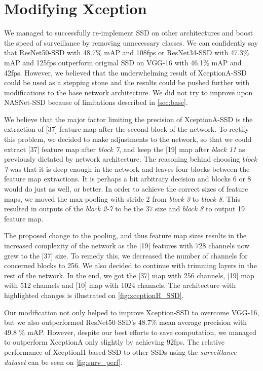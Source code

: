 \section{Modifying Xception}
\label{sec:fixxception}
We managed to successfully re-implement SSD on other architectures and boost the speed of surveillance by removing unnecessary classes. We can confidently say that ResNet50-SSD with 48.7\% mAP and 108fps or ResNet34-SSD with 47.3\% mAP and 125fps outperform original SSD on VGG-16 with 46.1\% mAP and 42fps. However, we believed that the underwhelming result of XceptionA-SSD could be used as a stepping stone and the results could be pushed further with modifications to the base network architecture. We did not try to improve upon NASNet-SSD because of limitations described in \cref{sec:base}.

We believe that the major factor limiting the precision of XceptionA-SSD is the extraction of [37] feature map after the second block of the network. To rectify this problem, we decided to make adjustments to the network, so that we could extract [37] feature map after \textit{block 7}, and keep the [19] map after \textit{block 11} as previously dictated by network architecture. The reasoning behind choosing \textit{block 7} was that it is deep enough in the network and leaves four blocks between the feature map extractions. It is perhaps a bit arbitrary decision and blocks 6 or 8 would do just as well, or better.  In order to achieve the correct sizes of feature maps, we moved the max-pooling with stride 2 from \textit{block 3} to \textit{block 8}. This resulted in outputs of the \textit{block 2-7} to be the 37 size and \textit{block 8} to output 19 feature map. 

The proposed change to the pooling, and thus feature map sizes results in the increased complexity of the network as the [19] features with 728 channels now grew to the [37] size. To remedy this, we decreased the number of channels for concerned blocks to 256. We also decided to continue with trimming layers in the rest of the network. In the end, we got the [37] map with 256 channels, [19] map with 512 channels and [10] map with 1024 channels. The architecture with highlighted changes is illustrated on \cref{fig:xceptionH_SSD}. 

Our modification not only helped to improve Xception-SSD to overcome VGG-16, but we also outperformed ResNet50-SSD's 48.7\% mean average precision with 49.8 \% mAP. However, despite our best efforts to save computation, we managed to outperform XceptionA only slightly by achieving 92fps. The relative performance of XceptionH based SSD to other SSDs using the \textit{surveillance dataset} can be seen on \cref{fig:surv_perf}.

